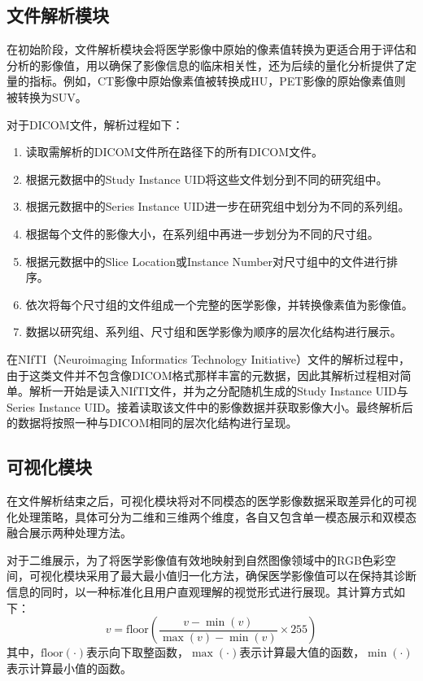 \subsection{文件解析模块}

在初始阶段，文件解析模块会将医学影像中原始的像素值转换为更适合用于评估和分析的影像值，用以确保了影像信息的临床相关性，还为后续的量化分析提供了定量的指标。例如，CT影像中原始像素值被转换成HU，PET影像的原始像素值则被转换为SUV。

对于DICOM文件，解析过程如下：
\begin{enumerate}[1)]
  \item 读取需解析的DICOM文件所在路径下的所有DICOM文件。
  \item 根据元数据中的Study Instance UID将这些文件划分到不同的研究组中。
  \item 根据元数据中的Series Instance UID进一步在研究组中划分为不同的系列组。
  \item 根据每个文件的影像大小，在系列组中再进一步划分为不同的尺寸组。
  \item 根据元数据中的Slice Location或Instance Number对尺寸组中的文件进行排序。
  \item 依次将每个尺寸组的文件组成一个完整的医学影像，并转换像素值为影像值。
  \item 数据以研究组、系列组、尺寸组和医学影像为顺序的层次化结构进行展示。
\end{enumerate}

在NIfTI（Neuroimaging Informatics Technology Initiative）文件的解析过程中，由于这类文件并不包含像DICOM格式那样丰富的元数据，因此其解析过程相对简单。解析一开始是读入NIfTI文件，并为之分配随机生成的Study Instance UID与Series Instance UID。接着读取该文件中的影像数据并获取影像大小。最终解析后的数据将按照一种与DICOM相同的层次化结构进行呈现。

\subsection{可视化模块}

在文件解析结束之后，可视化模块将对不同模态的医学影像数据采取差异化的可视化处理策略，具体可分为二维和三维两个维度，各自又包含单一模态展示和双模态融合展示两种处理方法。

对于二维展示，为了将医学影像值有效地映射到自然图像领域中的RGB色彩空间，可视化模块采用了最大最小值归一化方法，确保医学影像值可以在保持其诊断信息的同时，以一种标准化且用户直观理解的视觉形式进行展现。其计算方式如下：
\begin{equation}
  v =\text{floor}(\frac{v - \min(v)}{\max(v) - \min(v)} \times 255)
  \label{eq:chap05_min_max}
\end{equation}
其中，\(\text{floor}(\cdot)\)表示向下取整函数，\(\max(\cdot)\)表示计算最大值的函数，\(\min(\cdot)\)表示计算最小值的函数。


